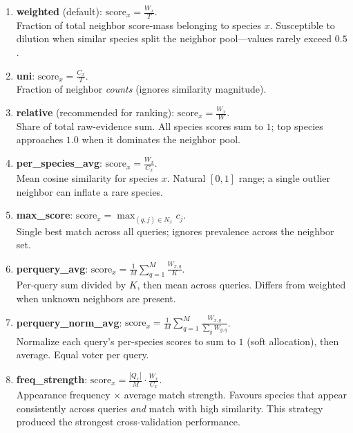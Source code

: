 \begin{enumerate}[font=\bfseries,label=\textbf{\arabic*.}]
\item \textbf{weighted} (default): $\displaystyle \mathrm{score}_x = \frac{W_x}{T}$.\\
Fraction of total neighbor score-mass belonging to species $x$. Susceptible to dilution when similar species split the neighbor pool---values rarely exceed $0.5$.

\item \textbf{uni}: $\displaystyle \mathrm{score}_x = \frac{C_x}{T}$.\\
Fraction of neighbor \emph{counts} (ignores similarity magnitude).

\item \textbf{relative} (recommended for ranking): $\displaystyle \mathrm{score}_x = \frac{W_x}{W}$.\\
Share of total raw-evidence sum. All species scores sum to $1$; top species approaches $1.0$ when it dominates the neighbor pool.

\item \textbf{per\_species\_avg}: $\displaystyle \mathrm{score}_x = \frac{W_x}{C_x}$.\\
Mean cosine similarity for species $x$. Natural $[0,1]$ range; a single outlier neighbor can inflate a rare species.

\item \textbf{max\_score}: $\displaystyle \mathrm{score}_x = \max_{(q,j) \in N_x} c_j$.\\
Single best match across all queries; ignores prevalence across the neighbor set.

\item \textbf{perquery\_avg}: $\displaystyle \mathrm{score}_x = \frac{1}{M} \sum_{q=1}^M \frac{W_{x,q}}{K}$.\\
Per-query sum divided by $K$, then mean across queries. Differs from weighted when unknown neighbors are present.

\item \textbf{perquery\_norm\_avg}: $\displaystyle \mathrm{score}_x = \frac{1}{M} \sum_{q=1}^M \frac{W_{x,q}}{\sum_{y} W_{y,q}}$.\\
Normalize each query's per-species scores to sum to $1$ (soft allocation), then average. Equal voter per query.

\item \textbf{freq\_strength}: $\displaystyle \mathrm{score}_x = \frac{|Q_x|}{M} \cdot \frac{W_x}{C_x}$.\\
Appearance frequency $\times$ average match strength. Favours species that appear consistently across queries \emph{and} match with high similarity. This strategy produced the strongest cross-validation performance.
\end{enumerate}

